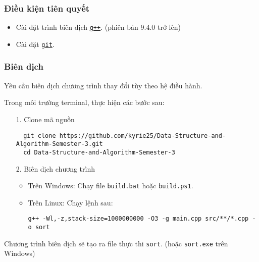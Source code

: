 \subsubsection{Điều kiện tiên quyết}
\begin{itemize}
  \item Cài đặt trình biên dịch \href{https://gcc.gnu.org/}{\texttt{g++}}. (phiên bản 9.4.0 trở lên)
  \item Cài đặt \href{https://git-scm.com/}{\texttt{git}}.
\end{itemize}

\subsubsection{Biên dịch}

Yêu cầu biên dịch chương trình thay đổi tùy theo hệ điều hành.

Trong môi trường terminal, thực hiện các bước sau:
\begin{itemize}
  \item[1.] Clone mã nguồn
  \begin{verbatim}
  git clone https://github.com/kyrie25/Data-Structure-and-Algorithm-Semester-3.git
  cd Data-Structure-and-Algorithm-Semester-3
  \end{verbatim}
  \item[2.] Biên dịch chương trình
  \begin{itemize}
    \item Trên Windows:
    Chạy file \texttt{build.bat} hoặc \texttt{build.ps1}. 
    \item Trên Linux:
    Chạy lệnh sau:
    \begin{verbatim}
g++ -Wl,-z,stack-size=1000000000 -O3 -g main.cpp src/**/*.cpp -o sort 
    \end{verbatim}
  \end{itemize}
\end{itemize}

Chương trình biên dịch sẽ tạo ra file thực thi \texttt{sort}. (hoặc \texttt{sort.exe} trên Windows)

\newpage